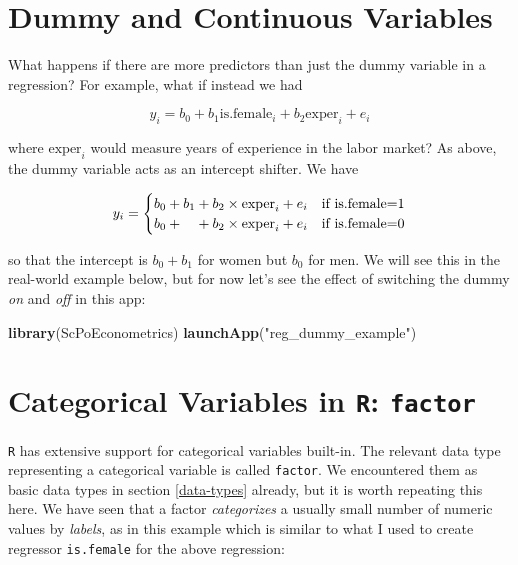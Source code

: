 \documentclass[]{book}
\newenvironment{Shaded}{\begin{snugshade}}{\end{snugshade}}
\newcommand{\KeywordTok}[1]{\textcolor[rgb]{0.13,0.29,0.53}{\textbf{#1}}}
\newcommand{\NormalTok}[1]{#1}
\newcommand{\StringTok}[1]{\textcolor[rgb]{0.31,0.60,0.02}{#1}}
\begin{document}
\hypertarget{dummy-and-continuous-variables}{%
\section{Dummy and Continuous Variables}\label{dummy-and-continuous-variables}}

What happens if there are more predictors than just the dummy variable in a regression? For example, what if instead we had

\begin{equation}
y_i = b_0 + b_1 \text{is.female}_i + b_2 \text{exper}_i + e_i \label{eq:dummy-reg2}
\end{equation}

where \(\text{exper}_i\) would measure years of experience in the labor market? As above, the dummy variable acts as an intercept shifter. We have

\begin{equation}
y_i =  \begin{cases}
b_0 + b_1 + b_2 \times \text{exper}_i + e_i & \text{if is.female=1} \\
b_0  + \hphantom{b_1} +b_2 \times \text{exper}_i + e_i & \text{if is.female=0}
\end{cases}
\end{equation}

so that the intercept is \(b_0 + b_1\) for women but \(b_0\) for men. We will see this in the real-world example below, but for now let's see the effect of switching the dummy \emph{on} and \emph{off} in this app:

\begin{Shaded}
\begin{Highlighting}[]
\KeywordTok{library}\NormalTok{(ScPoEconometrics)}
\KeywordTok{launchApp}\NormalTok{(}\StringTok{"reg_dummy_example"}\NormalTok{)}
\end{Highlighting}
\end{Shaded}

\hypertarget{categorical-variables-in-r-factor}{%
\section{\texorpdfstring{Categorical Variables in \texttt{R}: \texttt{factor}}{Categorical Variables in R: factor}}\label{categorical-variables-in-r-factor}}

\texttt{R} has extensive support for categorical variables built-in. The relevant data type representing a categorical variable is called \texttt{factor}. We encountered them as basic data types in section \ref{data-types} already, but it is worth repeating this here. We have seen that a factor \emph{categorizes} a usually small number of numeric values by \emph{labels}, as in this example which is similar to what I used to create regressor \texttt{is.female} for the above regression:
\end{document}

